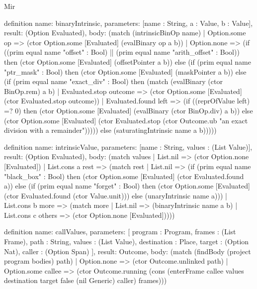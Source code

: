 \begin{lexlean}{Mir}
\begin{semanticmodule}
definition{
  name: binaryIntrinsic,
  parameters: [name : String, a : Value, b : Value],
  result: (Option Evaluated),
  body: (match (intrinsicBinOp name)
    | Option.some op => (ctor Option.some [Evaluated] (evalBinary op a b))
    | Option.none => (if ((prim equal name "offset" : Bool) || (prim equal name "arith_offset" : Bool)) then (ctor Option.some [Evaluated] (offsetPointer a b)) else (if (prim equal name "ptr_mask" : Bool) then (ctor Option.some [Evaluated] (maskPointer a b)) else (if (prim equal name "exact_div" : Bool) then (match (evalBinary (ctor BinOp.rem) a b)
      | Evaluated.stop outcome => (ctor Option.some [Evaluated] (ctor Evaluated.stop outcome))
      | Evaluated.found left => (if ((reprOfValue left) =? 0) then (ctor Option.some [Evaluated] (evalBinary (ctor BinOp.div) a b)) else (ctor Option.some [Evaluated] (ctor Evaluated.stop (ctor Outcome.ub "an exact division with a remainder"))))) else (saturatingIntrinsic name a b)))))
}

definition{
  name: intrinsicValue,
  parameters: [name : String, values : (List Value)],
  result: (Option Evaluated),
  body: (match values
    | List.nil => (ctor Option.none [Evaluated])
    | List.cons a rest => (match rest
      | List.nil => (if (prim equal name "black_box" : Bool) then (ctor Option.some [Evaluated] (ctor Evaluated.found a)) else (if (prim equal name "forget" : Bool) then (ctor Option.some [Evaluated] (ctor Evaluated.found (ctor Value.unit))) else (unaryIntrinsic name a)))
      | List.cons b more => (match more
        | List.nil => (binaryIntrinsic name a b)
        | List.cons c others => (ctor Option.none [Evaluated]))))
}

definition{
  name: callValues,
  parameters: [
    program : Program,
    frames : (List Frame),
    path : String,
    values : (List Value),
    destination : Place,
    target : (Option Nat),
    caller : (Option Span)
  ],
  result: Outcome,
  body: (match (findBody (project program bodies) path)
    | Option.none => (ctor Outcome.unlinked path)
    | Option.some callee => (ctor Outcome.running (cons (enterFrame callee values destination target false (nil Generic) caller) frames)))
}


\end{semanticmodule}
\end{lexlean}
